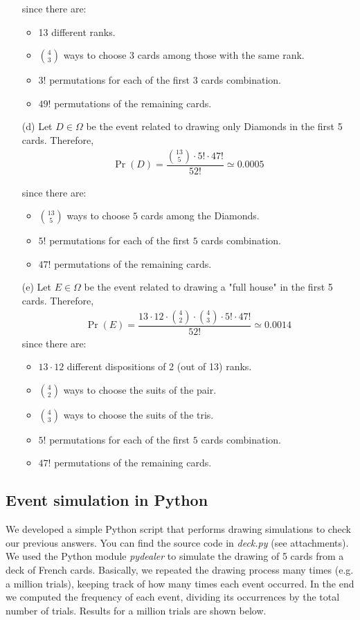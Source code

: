 \begin{itemize}
	since there are:
	\begin{itemize}
		\item 13 different ranks.
		\item $\binom{4}{3}$ ways to choose 3 cards among those with the same rank.
		\item $3!$ permutations for each of the first $3$ cards combination.
		\item $49!$ permutations of the remaining cards.
	\end{itemize}
	
	\item[(d)] Let $D \in \Omega$ be the event related to drawing only Diamonds in the first 5 cards. Therefore,
	\begin{align*}
		\Pr(D) = \dfrac{\binom{13}{5} \cdot 5! \cdot 47!}{52!} \simeq 0.0005
	\end{align*}
	
	since there are:
	\begin{itemize}
		\item $\binom{13}{5}$ ways to choose $5$ cards among the Diamonds.
		\item $5!$ permutations for each of the first $5$ cards combination.
		\item $47!$ permutations of the remaining cards.
	\end{itemize}
	
	\item[(e)] Let $E \in \Omega$ be the event related to drawing a "full house" in the first 5 cards. Therefore,
	\begin{align*}
		\Pr(E) = \dfrac{13 \cdot 12 \cdot \binom{4}{2} \cdot \binom{4}{3} \cdot 5! \cdot 47!}{52!} \simeq 0.0014
	\end{align*}
	since there are:
	\begin{itemize}
		\item $13 \cdot 12$ different dispositions of 2 (out of 13) ranks.
		\item $\binom{4}{2}$ ways to choose the suits of the pair.
		\item $\binom{4}{3}$ ways to choose the suits of the tris.
		\item $5!$ permutations for each of the first $5$ cards combination.
		\item $47!$ permutations of the remaining cards.
	\end{itemize}		
\end{itemize}


\subsection{Event simulation in Python}
We developed a simple Python script that performs drawing simulations to check our previous answers. You can find the source code in \textit{deck.py} (see attachments).
We used the Python module \textit{pydealer}\cite{pydealer} to simulate the drawing of 5 cards from a deck of French cards. Basically, we repeated the drawing process many times (e.g. a million trials), keeping track of how many times each event occurred.
In the end we computed the frequency of each event, dividing its occurrences by the total number of trials.
Results for a million trials are shown below.

